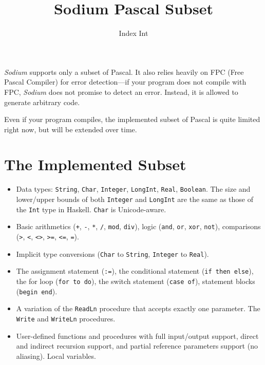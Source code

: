 \documentclass [a4paper] {article}
\title { Sodium Pascal Subset }
\author { Index Int }
\begin{document}
\maketitle

\lstset{language=Pascal}

\emph{Sodium} supports only a subset of Pascal. It also relies heavily on FPC
(Free Pascal Compiler) for error detection---if your program does not compile
with FPC, \emph{Sodium} does not promise to detect an error. Instead, it is
allowed to generate arbitrary code.

Even if your program compiles, the implemented subset of Pascal is quite limited
right now, but will be extended over time.

\section { The Implemented Subset }

\begin {itemize}

\item Data types: \texttt{String}, \texttt{Char}, \texttt{Integer},
\texttt{LongInt}, \texttt{Real}, \texttt{Boolean}. The size and lower/upper
bounds of both \texttt{Integer} and \texttt{LongInt} are the same as those of
the \texttt{Int} type in Haskell. \texttt{Char} is Unicode-aware.

\item Basic arithmetics (\texttt{+}, \texttt{-}, \texttt{*}, \texttt{/},
\texttt{mod}, \texttt{div}), logic (\texttt{and}, \texttt{or}, \texttt{xor},
\texttt{not}), comparisons (\texttt{>}, \texttt{<}, \texttt{<>}, \texttt{>=},
\texttt{<=}, \texttt{=}).

\item Implicit type conversions (\texttt{Char} to \texttt{String},
\texttt{Integer} to \texttt{Real}).

\item The assignment statement (\texttt{:=}), the conditional statement
(\texttt{if then else}), the for loop (\texttt{for to do}), the switch statement
(\texttt{case of}), statement blocks (\texttt{begin end}).

\item A variation of the \texttt{ReadLn} procedure that accepts exactly one
parameter. The \texttt{Write} and \texttt{WriteLn} procedures.

\item User-defined functions and procedures with full input/output support,
direct and indirect recursion support, and partial reference parameters support
(no aliasing). Local variables.

\end {itemize}
\end{document}
